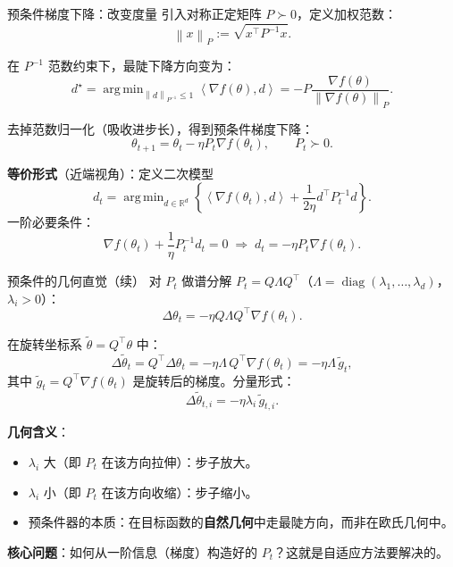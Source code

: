 \documentclass[aspectratio=169,10pt]{ctexbeamer}
\newcommand{\R}{\mathbb{R}}
\newcommand{\diag}{\operatorname{diag}}
\newcommand{\grad}{\nabla}
\newcommand{\norm}[1]{\left\lVert #1 \right\rVert}
\newcommand{\ip}[2]{\left\langle #1,#2 \right\rangle}
\DeclareMathOperator*{\argmin}{arg\,min}
\begin{document}
\begin{frame}{预条件梯度下降：改变度量}
引入对称正定矩阵 $P\succ0$，定义加权范数：
\[
  \norm{x}_P:=\sqrt{x^\top P^{-1}x}.
\]

\vspace{.25cm}
在 $P^{-1}$ 范数约束下，最陡下降方向变为：
\[
  d^\star=\argmin_{\norm{d}_{P^{-1}}\le 1}\ip{\grad f(\theta)}{d}
        =-P\frac{\grad f(\theta)}{\norm{\grad f(\theta)}_P}.
\]

\vspace{.25cm}
去掉范数归一化（吸收进步长），得到预条件梯度下降：
\[
  \boxed{\theta_{t+1}=\theta_t-\eta P_t\grad f(\theta_t),\qquad P_t\succ0.}
\]

\vspace{.25cm}
\textbf{等价形式}（近端视角）：定义二次模型
\[
  d_t=\argmin_{d\in\R^d}\left\{\ip{\grad f(\theta_t)}{d}+\frac{1}{2\eta}d^\top P_t^{-1}d\right\}.
\]
一阶必要条件：
\[
  \grad f(\theta_t)+\frac{1}{\eta}P_t^{-1}d_t=0\;\Longrightarrow\; d_t=-\eta P_t\grad f(\theta_t).
\]
\end{frame}

\begin{frame}{预条件的几何直觉（续）}
对 $P_t$ 做谱分解 $P_t=Q\Lambda Q^\top$（$\Lambda=\diag(\lambda_1,\ldots,\lambda_d)$，$\lambda_i>0$）：
\[
  \Delta\theta_t=-\eta Q\Lambda Q^\top\grad f(\theta_t).
\]

在旋转坐标系 $\tilde\theta=Q^\top\theta$ 中：
\[
  \Delta\tilde\theta_t = Q^\top\Delta\theta_t
  = -\eta\Lambda\,Q^\top\grad f(\theta_t)
  = -\eta\Lambda\,\tilde g_t,
\]
其中 $\tilde g_t=Q^\top\grad f(\theta_t)$ 是旋转后的梯度。分量形式：
\[
  \Delta\tilde\theta_{t,i}=-\eta\lambda_i\,\tilde g_{t,i}.
\]

\textbf{几何含义}：
\begin{itemize}
  \item $\lambda_i$ 大（即 $P_t$ 在该方向拉伸）：步子放大。
  \item $\lambda_i$ 小（即 $P_t$ 在该方向收缩）：步子缩小。
  \item 预条件器的本质：在目标函数的\textbf{自然几何}中走最陡方向，而非在欧氏几何中。
\end{itemize}

\vspace{.25cm}
\textbf{核心问题}：如何从一阶信息（梯度）构造好的 $P_t$？这就是自适应方法要解决的。
\end{frame}
\end{document}
